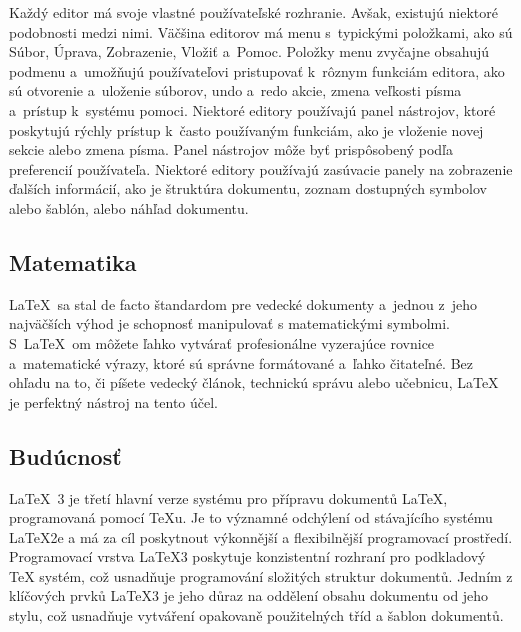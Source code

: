 \documentclass[a4paper, 11pt]{article}
\begin{document}
Každý editor má svoje vlastné používateľské rozhranie. Avšak, existujú niektoré podobnosti medzi nimi. Väčšina editorov má menu s~typickými položkami, ako sú Súbor, Úprava, Zobrazenie, Vložiť a~Pomoc. Položky menu zvyčajne obsahujú podmenu a~umožňujú používateľovi pristupovať k~rôznym funkciám editora, ako sú otvorenie a~uloženie súborov, undo a~redo akcie, zmena veľkosti písma a~prístup k~systému pomoci. Niektoré editory používajú panel nástrojov, ktoré poskytujú rýchly prístup k~často používaným funkciám, ako je vloženie novej sekcie alebo zmena písma. Panel nástrojov môže byť prispôsobený podľa preferencií používateľa. Niektoré editory používajú zasúvacie panely na zobrazenie ďalších informácií, ako je štruktúra dokumentu, zoznam dostupných symbolov alebo šablón, alebo náhľad dokumentu. \cite{HorejsiTomas2017}


\subsection{Matematika}
\LaTeX \ sa stal de facto štandardom pre vedecké dokumenty a~jednou z~jeho najväčších výhod je schopnosť manipulovať s matematickými symbolmi. S~\LaTeX \ om môžete ľahko vytvárať profesionálne vyzerajúce rovnice a~matematické výrazy, ktoré sú správne formátované a~ľahko čitateľné. Bez ohľadu na to, či píšete vedecký článok, technickú správu alebo učebnicu, LaTeX je perfektný nástroj na tento účel. \cite{WeiserTexMatematics}

\subsection{Budúcnosť}
\LaTeX \ 3 je třetí hlavní verze systému pro přípravu dokumentů LaTeX, programovaná pomocí TeXu. Je to významné odchýlení od stávajícího systému LaTeX2e a má za cíl poskytnout výkonnější a flexibilnější programovací prostředí. Programovací vrstva LaTeX3 poskytuje konzistentní rozhraní pro podkladový TeX systém, což usnadňuje programování složitých struktur dokumentů. Jedním z klíčových prvků LaTeX3 je jeho důraz na oddělení obsahu dokumentu od jeho stylu, což usnadňuje vytváření opakovaně použitelných tříd a šablon dokumentů. \cite{LATEX3}














\newpage

\renewcommand{\refname}{Literatúra}

\end{document}
